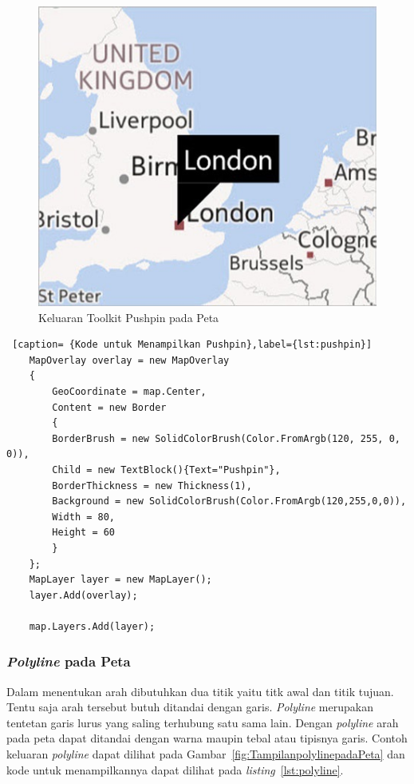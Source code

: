 \begin{figure}[h]
	\centering
		\includegraphics[scale=0.5]{Gambar/toolkit_pushpin}
	\caption{Keluaran Toolkit Pushpin pada Peta \cite{Manning}}
	\label{fig:toolkit_pushpin}
\end{figure}

\begin{lstlisting} [caption= {Kode untuk Menampilkan Pushpin},label={lst:pushpin}]
	MapOverlay overlay = new MapOverlay
	{
		GeoCoordinate = map.Center,
		Content = new Border
		{
		BorderBrush = new SolidColorBrush(Color.FromArgb(120, 255, 0, 0)),
		Child = new TextBlock(){Text="Pushpin"},
		BorderThickness = new Thickness(1),
		Background = new SolidColorBrush(Color.FromArgb(120,255,0,0)),
		Width = 80,
		Height = 60
		}
	};
	MapLayer layer = new MapLayer();
	layer.Add(overlay);

	map.Layers.Add(layer);
\end{lstlisting}

\subsubsection{\textit{Polyline} pada Peta}
\label{subsubsec:Polyline pada Peta}
\hspace{0.5cm} Dalam menentukan arah dibutuhkan dua titik yaitu titk awal dan titik tujuan. Tentu saja arah tersebut butuh ditandai dengan garis. \textit{Polyline} merupakan tentetan garis lurus yang saling terhubung satu sama lain. Dengan \textit{polyline} arah pada peta dapat ditandai dengan warna maupin tebal atau tipisnya garis. Contoh keluaran \textit{polyline} dapat dilihat pada Gambar~\ref{fig:TampilanpolylinepadaPeta} dan kode untuk menampilkannya dapat dilihat pada \textit{listing}~\ref{lst:polyline}.

